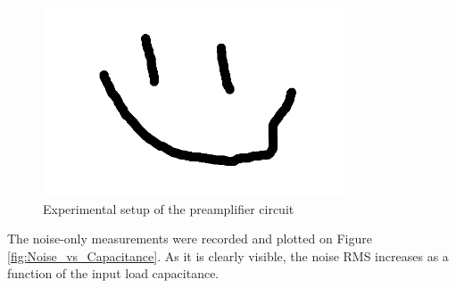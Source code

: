 \documentclass[12pt]{article}
\begin{document}
\begin{figure}[h]
  \centering
  \includegraphics[width=0.8\textwidth]{./graphics/placeholder}
  \caption{Experimental setup of the preamplifier circuit}
  \label{fig:preampsetup}
\end{figure}


The noise-only measurements were recorded and plotted on Figure \ref{fig:Noise_vs_Capacitance}. As it is clearly visible, the noise RMS increases as a function of the input load capacitance.
\end{document}
